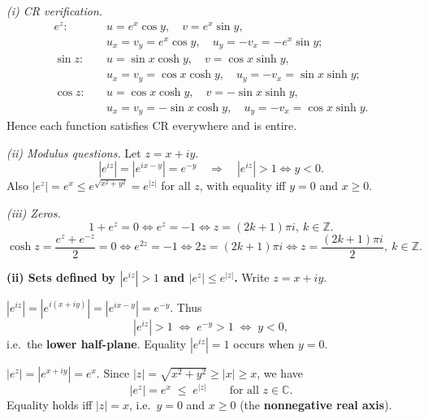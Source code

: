 \begin{solution}
\emph{(i) CR verification.}
\begin{align*}
e^{z}:\quad& u=e^{x}\cos y,\quad v=e^{x}\sin y,\\
&u_x=v_y=e^{x}\cos y,\quad u_y=-v_x=-e^{x}\sin y;\\[2pt]
\sin z:\quad& u=\sin x\cosh y,\quad v=\cos x\sinh y,\\
&u_x=v_y=\cos x\cosh y,\quad u_y=-v_x=\sin x\sinh y;\\[2pt]
\cos z:\quad& u=\cos x\cosh y,\quad v=-\sin x\sinh y,\\
&u_x=v_y=-\sin x\cosh y,\quad u_y=-v_x=\cos x\sinh y.
\end{align*}
Hence each function satisfies CR everywhere and is entire.

\medskip
\emph{(ii) Modulus questions.} Let $z=x+iy$.
\[
|e^{iz}|=|e^{ix-y}|=e^{-y}\quad\Rightarrow\quad |e^{iz}|>1 \iff y<0.
\]
Also $|e^{z}|=e^{x}\le e^{\sqrt{x^{2}+y^{2}}}=e^{|z|}$ for all $z$, with equality iff $y=0$ and $x\ge0$.

\medskip
\emph{(iii) Zeros.}
\[
1+e^{z}=0 \iff e^{z}=-1 \iff z=(2k+1)\pi i,\ k\in\mathbb{Z}.
\]
\[
\cosh z=\frac{e^{z}+e^{-z}}{2}=0 \iff e^{2z}=-1
\iff 2z=(2k+1)\pi i \iff z=\frac{(2k+1)\pi i}{2},\ k\in\mathbb{Z}.
\]

\par\medskip\noindent\textbf{(ii) Sets defined by $|e^{iz}|>1$ and $|e^{z}|\le e^{|z|}$.}\quad 
Write $z=x+iy$.

	\par\noindent\textbullet\quad $|e^{iz}|=|e^{i(x+iy)}|=|e^{ix-y}|=e^{-y}$. Thus
	\[
	|e^{iz}|>1 \;\Longleftrightarrow\; e^{-y}>1 \;\Longleftrightarrow\; y<0,
	\]
	i.e.\ the \textbf{lower half-plane}. Equality $|e^{iz}|=1$ occurs when $y=0$.

	\par\noindent\textbullet\quad $|e^{z}|=|e^{x+iy}|=e^{x}$. Since $|z|=\sqrt{x^{2}+y^{2}}\ge |x|\ge x$, we have
	\[
	|e^{z}| = e^{x} \;\le\; e^{|z|}\qquad\text{for all }z\in\mathbb{C}.
	\]
	Equality holds iff $|z|=x$, i.e.\ $y=0$ and $x\ge 0$ (the \textbf{nonnegative real axis}).
\end{solution}

